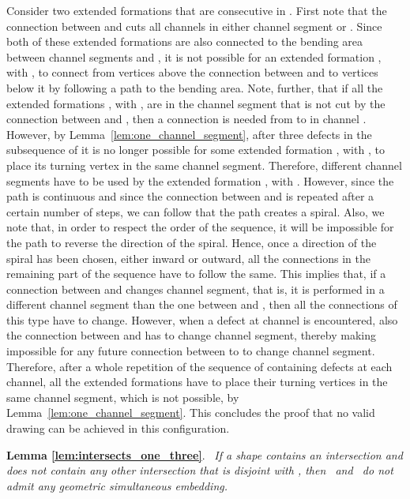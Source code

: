 \documentclass[a4paper,10pt]{llncs}
\renewenvironment{proof}
{{\bf Proof:}}{\hspace*{\fill}\par\vspace{2mm}}
\newcommand{\rephrase}[3]{\noindent\textbf{#1 #2}.~\emph{#3}}
\newcommand{\T}{\mbox{ }}
\renewcommand{\P}{\mbox{ }}
\begin{document}
\begin{proof}
Consider two extended formations  that are consecutive in .
First note that the connection between  and  cuts all channels  in either channel segment  or .
Since both of these extended formations are also connected to the bending area between channel segments  and , it is not possible for an extended formation , with , to connect from vertices above the connection between  and  to vertices below it by following a path to the bending area.
Note, further, that if all the extended formations , with , are in the channel
segment that is not cut by the connection between  and , then a connection is needed from  to  in channel . However, by Lemma~\ref{lem:one_channel_segment}, after three defects in the subsequence of  it is no longer possible for some extended formation , with , to place its turning vertex in the same channel segment. Therefore, different channel segments have to be used by the extended formation , with . However, since the path is continuous and since the connection between  and  is repeated after a certain number of steps, we can follow that the path creates a spiral. Also, we note that, in order to respect the order of the sequence, it will be impossible for the path to reverse the direction of the spiral. Hence, once a direction of the spiral has been chosen, either inward or outward, all the connections in the remaining part of the sequence have to follow the same.
This implies that, if a connection between  and  changes channel segment, that is, it is performed in a different channel segment than the one between  and , then all the connections of this type have to change. However, when a defect at channel  is encountered, also the connection between  and  has to change channel segment, thereby making impossible for any future connection between  to  to change channel segment. Therefore, after a whole repetition of the sequence of  containing defects at each channel, all the extended formations have to place their turning vertices in the same channel segment, which is not possible, by Lemma~\ref{lem:one_channel_segment}. This concludes the proof that no valid drawing can be achieved in this configuration.
\end{proof}

\rephrase{Lemma}{\ref{lem:intersects_one_three}}{
If a shape contains an intersection  and does not contain any other intersection that is disjoint with , then \T and \P do not admit any geometric simultaneous embedding.
}
\end{document}
